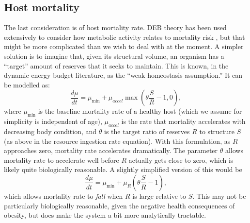\documentclass[12pt,reqno,final,pdftex]{amsart}\usepackage[]{graphicx}\usepackage[]{color}
\theoremstyle{plain}
\numberwithin{equation}{part}
\begin{document}
\subsection*{Host mortality}
The last consideration is of host mortality rate.
DEB theory has been used extensively to consider how metabolic activity relates to mortality risk \citep[by keeping track of things like oxidative damage, e.g.,][]{vanLeeuwen2002,Kooijman2009}, but that might be more complicated than we wish to deal with at the moment.
A simpler solution is to imagine that, given its structural volume, an organism has a ``target'' amount of reserves that it seeks to maintain.
This is known, in the dynamic energy budget literature, as the ``weak homeostasis assumption.''
It can be modelled as:
\begin{equation}
\frac{d\mu}{dt} = \mu_{\min} + \mu_{accel}\max\left(\theta \frac{S}{R}-1, 0\right),
\end{equation}
where $\mu_{\min}$ is the baseline mortality rate of a healthy host (which we assume for simplicity is independent of age), $\mu_{accel}$ is the rate that mortality accelerates with decreasing body condition, and $\theta$ is the target ratio of reserves $R$ to structure $S$ (as above in the resource ingestion rate equation).
With this formulation, as $R$ approaches zero, mortality rate accelerates dramatically.
The parameter $\theta$ allows mortality rate to accelerate well before $R$ actually gets close to zero, which is likely quite biologically reasonable.
A slightly simplified version of this would be
\begin{equation}
\frac{d\mu}{dt} = \mu_{\min} + \mu_{R}\left(\theta \frac{S}{R} - 1\right),
\end{equation}
which allows mortality rate to \emph{fall} when $R$ is large relative to $S$.
This may not be particularly biologically reasonable, given the negative health consequences of obesity, but does make the system a bit more analytically tractable.
\end{document}
